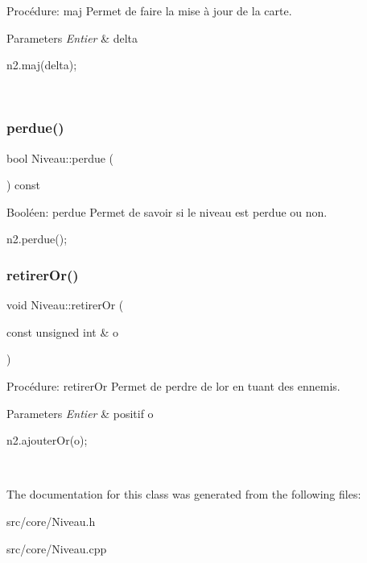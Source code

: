Procédure\+: maj Permet de faire la mise à jour de la carte. 


\begin{DoxyParams}{Parameters}
{\em Entier} & delta 
\begin{DoxyCode}
n2.maj(delta);
\end{DoxyCode}
 \\
\hline
\end{DoxyParams}
\mbox{\label{classNiveau_ad1345f4f482fdd18213cab3b4cd8b8dc}} 
\subsubsection{\texorpdfstring{perdue()}{perdue()}}
{\footnotesize\ttfamily bool Niveau\+::perdue (\begin{DoxyParamCaption}{ }\end{DoxyParamCaption}) const}



Booléen\+: perdue Permet de savoir si le niveau est perdue ou non. 


\begin{DoxyCode}
n2.perdue();
\end{DoxyCode}
 \mbox{\label{classNiveau_a11f7ce4e0918a94d41c66459394cdd49}} 
\subsubsection{\texorpdfstring{retirer\+Or()}{retirerOr()}}
{\footnotesize\ttfamily void Niveau\+::retirer\+Or (\begin{DoxyParamCaption}\item[{const unsigned int \&}]{o }\end{DoxyParamCaption})}



Procédure\+: retirer\+Or Permet de perdre de l\textquotesingle{}or en tuant des ennemis. 


\begin{DoxyParams}{Parameters}
{\em Entier} & positif o 
\begin{DoxyCode}
n2.ajouterOr(o);
\end{DoxyCode}
 \\
\hline
\end{DoxyParams}


The documentation for this class was generated from the following files\+:\begin{DoxyCompactItemize}
\item 
src/core/Niveau.\+h\item 
src/core/Niveau.\+cpp\end{DoxyCompactItemize}

